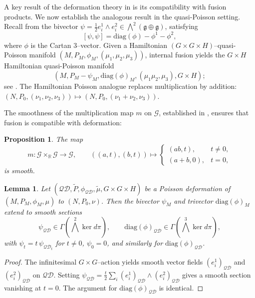 \documentclass[reqno]{amsart}
\theoremstyle{plain}
\newtheorem{Prop}[Thm]{Proposition}
\newtheorem{Lem}[Thm]{Lemma}
\theoremstyle{definition}
\begin{document}
A key result of the deformation theory in \cite{JMM2025deformations} is its compatibility with fusion products. We now establish the analogous result in the quasi-Poisson setting. Recall from \cite[]{alekseev2002quasi} the bivector $\psi=\tfrac{1}{2}e^{1}_{i}\wedge e^{2}_{i}\in\bigwedge^{2}(\mathfrak{g}\oplus\mathfrak{g})$, satisfying
\[
[\psi,\psi]=\mathrm{diag}(\phi)-\phi^{1}-\phi^{2},
\]
where $\phi$ is the Cartan 3--vector. Given a Hamiltonian $(G\times G\times H)$--quasi-Poisson manifold $(M,P_{M},\phi_{M},(\mu_{1},\mu_{2},\mu_{3}))$, internal fusion yields the $G\times H$ Hamiltonian quasi-Poisson manifold
\[
(M,P_{M}-\psi_{M},\mathrm{diag}(\phi)_{M},(\mu_{1}\mu_{2},\mu_{3}),G\times H);
\]
see \cite[]{alekseev2002quasi}. The Hamiltonian Poisson analogue replaces multiplication by addition: $(N,P_{0},(\nu_{1},\nu_{2},\nu_{3}))\mapsto (N,P_{0},(\nu_{1}+\nu_{2},\nu_{3}))$.

The smoothness of the multiplication map $m$ on $\mathcal{G}$, established in \cite[]{JMM2025deformations}, ensures that fusion is compatible with deformation:

\begin{Prop}\cite[]{JMM2025deformations}\label{prop:mult-smooth}
The map
\[
m:\mathcal{G}\times_{\mathbb{R}}\mathcal{G}\to\mathcal{G},\qquad
((a,t),(b,t))\mapsto
\begin{cases}
(ab,t), & t\neq 0,\\[4pt]
(a+b,0), & t=0,
\end{cases}
\]
is smooth.
\end{Prop}

\begin{Lem}\label{lem 3.2}
Let $(\mathcal{QD},\tilde{P},\phi_{\mathcal{QD}},\tilde{\mu},G\times G\times H)$ be a Poisson deformation of $(M,P_{M},\phi_{M},\mu)$ to $(N,P_{0},\nu)$. Then the bivector $\psi_{M}$ and trivector $\mathrm{diag}(\phi)_{M}$ extend to smooth sections
\[
\psi_{\mathcal{QD}}\in\Gamma\!\left(\bigwedge^{2}\ker d\pi\right),\qquad
\mathrm{diag}(\phi)_{\mathcal{QD}}\in\Gamma\!\left(\bigwedge^{3}\ker d\pi\right),
\]
with $\psi_{t}=t\,\psi_{\mathcal{QD}_{t}}$ for $t\neq 0$, $\psi_{0}=0$, and similarly for $\mathrm{diag}(\phi)_{\mathcal{QD}}$.
\end{Lem}

\begin{proof}
The infinitesimal $G\times G$--action yields smooth vector fields $(e_{i}^{1})_{\mathcal{QD}}$ and $(e_{i}^{2})_{\mathcal{QD}}$ on $\mathcal{QD}$. Setting $\psi_{\mathcal{QD}}=\frac{t}{2}\sum_{i}(e_{i}^{1})_{\mathcal{QD}}\wedge(e_{i}^{2})_{\mathcal{QD}}$ gives a smooth section vanishing at $t=0$. The argument for $\mathrm{diag}(\phi)_{\mathcal{QD}}$ is identical.
\end{proof}
\end{document}
